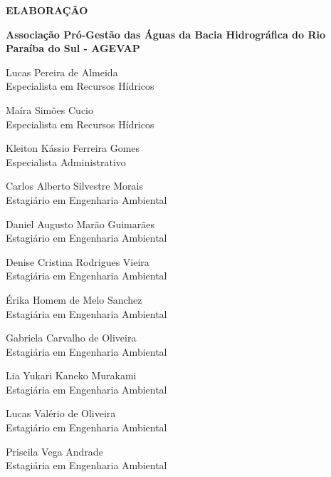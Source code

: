 
	\begin{flushleft}
	{\bfseries\Large\MakeUppercase{Elaboração}}\vspace{1.5em}
	
	\textbf{Associação Pró-Gestão das Águas da Bacia Hidrográfica do Rio Paraíba do Sul - AGEVAP}\vspace{1em}

	{Lucas Pereira de Almeida\\
 	 Especialista em Recursos Hídricos}\vspace{1em}

	{Maíra Simões Cucio\\
	Especialista em Recursos Hídricos}\vspace{1em}

	{Kleiton Kássio Ferreira Gomes\\
	Especialista Administrativo}\vspace{1em} 

	{Carlos Alberto Silvestre Morais\\
	Estagiário em Engenharia Ambiental}\vspace{1em}
	
	{Daniel Augusto Marão Guimarães\\
    Estagiário em Engenharia Ambiental}\vspace{1em}
	
	{Denise Cristina Rodrigues Vieira\\
	Estagiária em Engenharia Ambiental}\vspace{1em}
	
	{Érika Homem de Melo Sanchez\\
	Estagiária em Engenharia Ambiental}\vspace{1em}
	
	{Gabriela Carvalho de Oliveira\\
	Estagiária em Engenharia Ambiental}\vspace{1em}
	
	{Lia Yukari Kaneko Murakami\\
	Estagiária em Engenharia Ambiental}\vspace{1em}
	
	{Lucas Valério de Oliveira\\
	Estagiário em Engenharia Ambiental}\vspace{1em}
	
	{Priscila Vega Andrade\\
	Estagiária em Engenharia Ambiental}\vspace{1em}
	

\end{flushleft}
